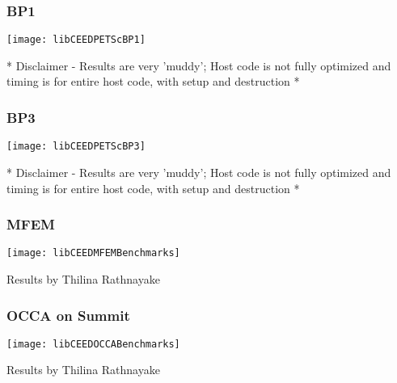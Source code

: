 \documentclass{beamer}
\begin{document}

\begin{frame}
\begin{center}
\frametitle{BP1}

\texttt{[image: libCEEDPETScBP1]}

* Disclaimer - Results are very 'muddy'; Host code is not fully optimized and timing is for entire host code, with setup and destruction *

\end{center}
\end{frame}


\begin{frame}
\begin{center}
\frametitle{BP3}

\texttt{[image: libCEEDPETScBP3]}

* Disclaimer - Results are very 'muddy'; Host code is not fully optimized and timing is for entire host code, with setup and destruction *

\end{center}
\end{frame}


\begin{frame}
\begin{center}
\frametitle{MFEM}

\centerline{\texttt{[image: libCEEDMFEMBenchmarks]}}

Results by Thilina Rathnayake

\end{center}
\end{frame}


\begin{frame}
\begin{center}
\frametitle{OCCA on Summit}

\centerline{\texttt{[image: libCEEDOCCABenchmarks]}}

Results by Thilina Rathnayake

\end{center}
\end{frame}

\end{document}

